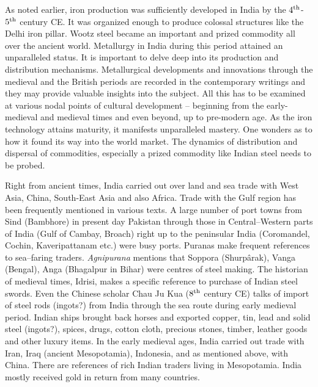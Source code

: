 As noted earlier, iron production was sufficiently developed in India by the $4^{\rm th}$-$5^{\rm th}$ century CE. It was organized enough to produce colossal structures like the Delhi iron pillar. Wootz steel became an important and prized commodity all over the ancient world. Metallurgy in India during this period attained an unparalleled status. It is important to delve deep into its production and distribution mechanisms. Metallurgical developments and innovations through the medieval and the British periods are recorded in the contemporary writings and they may provide valuable insights into the subject. All this has to be examined at various nodal points of cultural development – beginning from the early-medieval and medieval times and even beyond, up to pre-modern age. As the iron technology attains maturity, it manifests unparalleled mastery. One wonders as to how it found its way into the world market. The dynamics of distribution and dispersal of commodities, especially a prized commodity like Indian steel needs to be probed.

Right from ancient times, India carried out over land and sea trade with West Asia, China, South-East Asia and also Africa. Trade with the Gulf region has been frequently mentioned in various texts. A large number of port towns from Sind (Bambhore) in present day Pakistan through those in Central–Western parts of India (Gulf of Cambay, Broach) right up to the peninsular India (Coromandel, Cochin, Kaveripattanam etc.) were busy ports. Puranas make frequent references to sea–faring traders. \textit{Agnipurana} mentions that Soppora (Shurpârak), Vanga (Bengal), Anga (Bhagalpur in Bihar) were centres of steel making. The historian of medieval times, Idrisi, makes a specific reference to purchase of Indian steel swords. Even the Chinese scholar Chau Ju Kua ($8^{\rm th}$ century CE) talks of import of steel rods (ingots?) from India through the sea route during early medieval period. Indian ships brought back horses and exported copper, tin, lead and solid steel (ingots?), spices, drugs, cotton cloth, precious stones, timber, leather goods and other luxury items. In the early medieval ages, India carried out trade with Iran, Iraq (ancient Mesopotamia), Indonesia, and as mentioned above, with China. There are references of rich Indian traders living in Mesopotamia. India mostly received gold in return from many countries.

\vspace{0.5cm}

